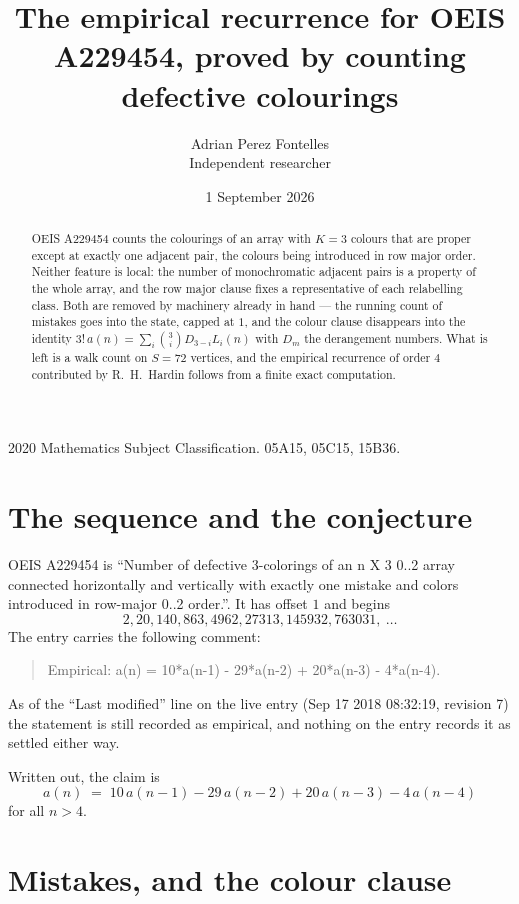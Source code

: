 \documentclass[11pt,a4paper]{article}
\title{The empirical recurrence for OEIS A229454, proved by counting defective colourings}
\author{Adrian Perez Fontelles\\ \small Independent researcher}
\date{1 September 2026}
\theoremstyle{plain}
\theoremstyle{definition}
\begin{document}
\maketitle

\begin{abstract}
OEIS A229454 counts the colourings of an array with $K=3$ colours that are proper except at
exactly one adjacent pair, the colours being introduced in row
major order. Neither feature is local: the number of monochromatic adjacent pairs is a
property of the whole array, and the row major clause fixes a representative of each
relabelling class. Both are removed by machinery already in hand --- the running count of
mistakes goes into the state, capped at $1$, and the colour clause disappears into the
identity $3!\,a(n)=\sum_i\binom{3}{i}D_{3-i}L_i(n)$ with $D_m$ the derangement
numbers. What is left is a walk count on $S=72$ vertices, and the empirical recurrence of
order $4$ contributed by R.~H.~Hardin follows from a finite exact computation.
\end{abstract}

\noindent\small 2020 Mathematics Subject Classification. 05A15, 05C15, 15B36.\normalsize

\section{The sequence and the conjecture}

OEIS A229454 is ``Number of defective 3-colorings of an n X 3 0..2 array connected horizontally and vertically with exactly one mistake and colors introduced in row-major 0..2 order.''. It has offset $1$ and begins
\[
2, 20, 140, 863, 4962, 27313, 145932, 763031,\ \dots
\]
The entry carries the following comment:
\begin{quote}\small
Empirical: a(n) = 10*a(n-1) - 29*a(n-2) + 20*a(n-3) - 4*a(n-4).
\end{quote}
As of the ``Last modified'' line on the live entry (Sep 17 2018 08:32:19, revision 7) the statement is
still recorded as empirical, and nothing on the entry records it as settled either way.

Written out, the claim is
\begin{equation}\label{eq:conj}
a(n)\;=\;10\,a(n-1) - 29\,a(n-2) + 20\,a(n-3) - 4\,a(n-4)
\end{equation}
for all $n>4$.

\section{Mistakes, and the colour clause}
\end{document}
